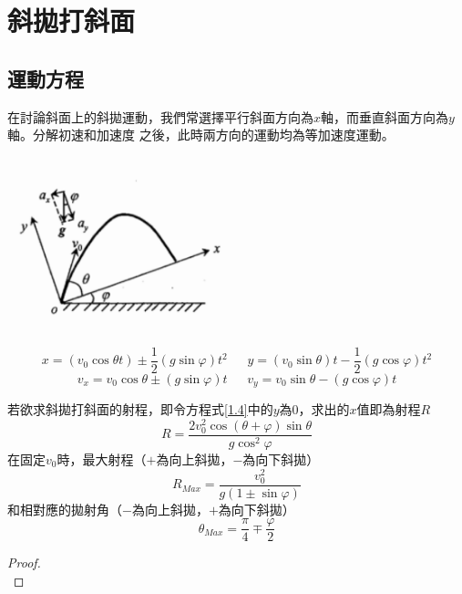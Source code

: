 \documentclass[cn,10pt,math=newtx,chinesefont=founder]{../elegantbook}
\begin{document}
\section{斜拋打斜面}
\subsection{運動方程}
在討論斜面上的斜拋運動，我們常選擇平行斜面方向為$x$軸，而垂直斜面方向為$y$軸。分解初速和加速度
之後，此時兩方向的運動均為等加速度運動。\\
\begin{minipage}{\linewidth}
    \begin{minipage}{0.45\linewidth}
\raggedleft
\flushleft
\includegraphics[width=0.5\textwidth]{image/斜拋打斜面.png}
    \end{minipage}
    \hspace{0.05\linewidth}
    \begin{minipage}{0.45\linewidth}
\raggedright
\begin{equation} \label{1.5}
    x = (v_0 \cos\theta t)\pm \frac{1}{2}(g \sin \varphi) t^2 \ \ \ \ \ \ \ y = (v_0 \sin\theta)t -\frac{1}{2}(g\cos \varphi) t^2
\end{equation}
\begin{equation}
    v_x = v_0 \cos\theta \pm (g \sin \varphi) t \ \ \ \ \ \ \ v_y = v_0 \sin\theta - (g\cos \varphi) t
\end{equation}
    \end{minipage}
\end{minipage}
若欲求斜拋打斜面的射程，即令方程式\ref{1.4}中的$y$為0，求出的$x$值即為射程$R$
\begin{equation}
    R = \frac{2v_0^2 \cos (\theta+\varphi)\sin \theta}{g\cos^2 \varphi}
\end{equation}
在固定$v_0$時，最大射程（$+$為向上斜拋，$-$為向下斜拋）
\begin{equation}
    R_{Max}=\frac{v_0^2}{g(1\pm \sin \varphi)}
\end{equation}
和相對應的拋射角（$-$為向上斜拋，$+$為向下斜拋）
\begin{equation}
    \theta_{Max} = \frac{\pi}{4} \mp \frac{\varphi}{2}
\end{equation}
\begin{proof}
    \\[20em]
\end{proof}
\end{document}
